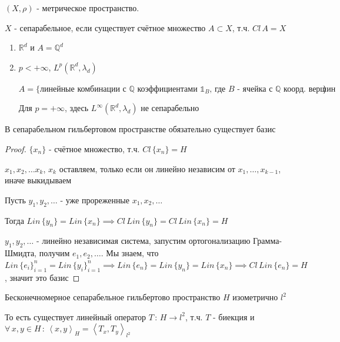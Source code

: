 \begin{definition}
    $(X, \rho)$ - метрическое пространство.

    $X$ - сепарабельное, если существует счётное множество $A \subset X$, т.ч. $Cl \, A = X$
\end{definition}

\begin{example}
    \begin{enumerate}
        \item {
            $\mathbb{R}^d$ и $A = \mathbb{Q}^d$
        }
        \item {
            $p < +\infty$, $L^p (\mathbb{R}^d, \lambda_d)$

            $A = \{ \text{линейные комбинации с $\mathbb{Q}$ коэффициентами $\mathds{1}_B$, где $B$ - ячейка с $\mathbb{Q}$ коорд. вершин} \} $

            Для $p = +\infty$, здесь $L^\infty (\mathbb{R}^d, \lambda_d)$ не сепарабельно
        }
    \end{enumerate}
\end{example}

\begin{theorem}
    В сепарабельном гильбертовом пространстве обязательно существует базис
\end{theorem}

\begin{proof}
    $\{ x_n \}$ - счётное множество, т.ч. $Cl \, \{ x_n \} = H$

    $x_1, x_2, \ldots x_k$, $x_k$ оставляем, только если он линейно независим от $x_1, \ldots, x_{k - 1}$, иначе выкидываем

    Пусть $y_1, y_2, \ldots$ - уже прореженные $x_1, x_2, \ldots$

    Тогда $Lin \, \{ y_n \} = Lin \, \{ x_n \} \implies Cl \, Lin \, \{ y_n \} = Cl \, Lin \, \{ x_n \} = H$

    $y_1, y_2, \ldots$ - линейно независимая система, запустим ортогонализацию Грамма-Шмидта, получим $e_1, e_2, \ldots$.
    Мы знаем, что $Lin \, \{ e_i \}_{i = 1}^n = Lin \, \{ y_i \}_{i = 1}^n \implies Lin \, \{ e_n \} = Lin \, \{ y_n \} = Lin \, \{ x_n \} \implies Cl \, Lin \, \{e_n \} = H$, значит это базис
\end{proof}

\begin{theorem}
    Бесконечномерное сепарабельное гильбертово пространство $H$ изометрично $l^2$

    То есть существует линейный оператор $T \, : \, H \to l^2$, т.ч. $T$ - биекция и $\forall \, x, y \in H \, : \, \left < x, y \right >_H = \left < T_x, T_y \right >_{l^2}$
\end{theorem}

